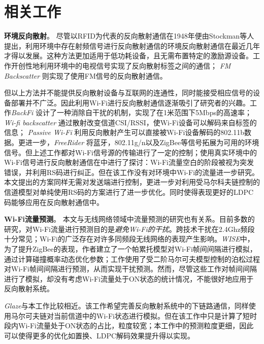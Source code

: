 
\chapter{相关工作}
\label{chap:related}

\textbf{环境反向散射}。
尽管以RFID为代表的反向散射通信在1948年便由Stockman等人提出\cite{stockman1948communication}，利用环境中存在射频信号进行反向散射通信的环境反向散射通信在最近几年才得以发展。这种方法更加适用于低功耗设备，且无需布置特定的激励源设备。工作\cite{liu2013ambient}开创性地利用环境中的电视信号实现了反向散射标签之间的通信；
\textit{FM Backscatter}\cite{wang2017fm}%
则实现了使用FM信号的反向散射通信。

但以上方法并不能提供反向散射设备与互联网的连通性，同时能接受相应信号的设备部署并不广泛。因此利用Wi-Fi进行反向散射通信逐渐吸引了研究者的兴趣。工作\textit{BackFi}
\cite{bharadia2015backfi} %
设计了一种消除自干扰的机制，实现了在1米范围下5Mbps的高速率；
\textit{Wi-fi backscatter}\cite{kellogg2014wi}
通过散射改变信道CSI/RSSI，使Wi-Fi设备可以解码来自标签的信息；
\textit{Passive Wi-Fi}\cite{kellogg2016passive}%
利用反向散射产生可以直接被Wi-Fi设备解码的802.11b数据。更进一步，\textit{FreeRider}\cite{zhang2017freerider}
将蓝牙，802.11g/n以及ZigBee等信号拓展为可用的环境信号。但上述工作都对Wi-Fi信号源的传输进行了一定的控制；使用真实环境中的Wi-Fi信号进行反向散射通信在\cite{OFFB}中进行了探讨：Wi-Fi流量空白的阶段被视为突发错误，并利用RS码进行纠正。但在该工作没有对环境中Wi-Fi的流量进一步研究。本文提出的方案同样无需对发送端进行控制，更进一步对利用受马尔科夫链控制的信道模型对单纯使用RS码的方案进行了进一步优化。同时使得表现更好的LDPC码能够应用在反向散射通信中。

\textbf{Wi-Fi流量预测}。
本文与无线网络领域中流量预测的研究也有关系。目前多数的研究，对Wi-Fi流量进行预测目的是\emph{避免Wi-Fi的干扰}。跨技术干扰在2.4Ghz频段十分常见；Wi-Fi的广泛存在对许多同频段无线网络的表现产生影响。\textit{WISE}\cite{huang2010beyond}中，为了提升ZigBee的表现，作者建立了一个帕累托模型对Wi-Fi帧间间隔进行模拟，通过计算碰撞概率动态优化参数；工作\cite{dhanapala2017modeling}使用了受二阶马尔可夫模型控制的泊松过程
对Wi-Fi帧间间隔进行预测，从而实现干扰预测。然而，尽管这些工作对帧间间隔进行了模拟，却没有考虑Wi-Fi流量处于ON状态的统计情况，不能很好地应用于反向散射系统。

\textit{Glaze}\cite{kapetanovic2019glaze}与本工作比较相近。该工作希望完善反向散射系统中的下链路通信，同样使用马尔可夫链对当前信道中的Wi-Fi状态进行模拟。但在该工作中只是计算了短时段内Wi-Fi流量处于ON状态的占比，粒度较宽；本工作中的预测粒度更细，因此可以使得更多的优化如置换、LDPC解码效果提升得以实现。
